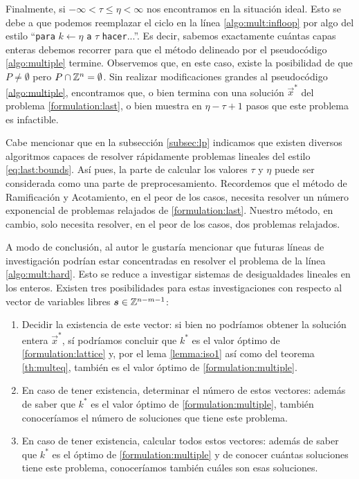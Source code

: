 Finalmente, si $-\infty < \tau \leq \eta < \infty$ nos encontramos en la situación ideal. Esto
se debe a que podemos reemplazar el ciclo en la línea \ref{algo:mult:infloop} por algo del estilo
``\texttt{para} $k \leftarrow \eta$ \texttt{a} $\tau$ \texttt{hacer}...''. Es decir, sabemos exactamente
cuántas capas enteras debemos recorrer para que el método delineado por el pseudocódigo
\eqref{algo:multiple} termine. Observemos que, en este caso, existe la posibilidad de que $P \neq
\emptyset$ pero $P \cap \mathbb{Z}^n = \emptyset$. Sin realizar modificaciones grandes al pseudocódigo
\eqref{algo:multiple}, encontramos que, o bien termina con una solución $\vec{x}^*$ del problema
\eqref{formulation:last}, o bien muestra en $\eta - \tau + 1$ pasos que este problema es infactible.

Cabe mencionar que en la subsección \eqref{subsec:lp} indicamos que existen diversos algoritmos
capaces de resolver rápidamente problemas lineales del estilo \eqref{eq:last:bounds}. Así pues, la
parte de calcular los valores $\tau$ y $\eta$ puede ser considerada como una parte de
preprocesamiento. Recordemos que el método de Ramificación y Acotamiento, en el peor de los casos,
necesita resolver un número exponencial de problemas relajados de \eqref{formulation:last}. Nuestro
método, en cambio, solo necesita resolver, en el peor de los casos, dos problemas relajados.

A modo de conclusión, al autor le gustaría mencionar que futuras líneas de investigación podrían
estar concentradas en resolver el problema de la línea \ref{algo:mult:hard}. Esto se reduce a
investigar sistemas de desigualdades lineales en los enteros. Existen tres posibilidades para estas
investigaciones con respecto al vector de variables libres $\boldsymbol{s} \in \mathbb{Z}^{n-m-1}$:
\begin{enumerate}
	\item Decidir la existencia de este vector: si bien no podríamos obtener la solución entera
		$\vec{x}^*$, sí podríamos concluir que $k^*$ es el valor óptimo de
		\eqref{formulation:lattice} y, por el lema \ref{lemma:iso1} así como del teorema
		\ref{th:multeq}, también es el valor óptimo de \eqref{formulation:multiple}.
	\item En caso de tener existencia, determinar el número de estos vectores: además de saber que
		$k^*$ es el valor óptimo de \eqref{formulation:multiple}, también conoceríamos el número de
		soluciones que tiene este problema.
	\item En caso de tener existencia, calcular todos estos vectores: además de saber que $k^*$ es
		el óptimo de \eqref{formulation:multiple} y de conocer cuántas soluciones tiene este
		problema, conoceríamos también cuáles son esas soluciones.
\end{enumerate}

